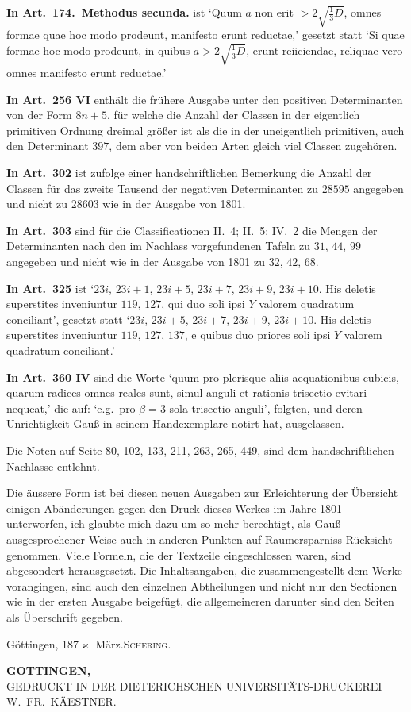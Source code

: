 \documentclass[12pt,a4paper]{article}
\theoremstyle{plain}
\theoremstyle{definition}
\theoremstyle{remark}
\begin{document}
\textbf{In Art.\ 174.\ Methodus secunda.} ist `Quum $a$ non erit $> 2\sqrt{\tfrac{1}{3}D}$, omnes formae quae hoc modo prodeunt, manifesto erunt reductae,' gesetzt statt `Si quae formae hoc modo prodeunt, in quibus $a > 2\sqrt{\tfrac{1}{3}D}$, erunt reiiciendae, reliquae vero omnes manifesto erunt reductae.'

\textbf{In Art.\ 256 VI} enth\"alt die fr\"uhere Ausgabe unter den positiven Determinanten von der Form $8n+5$, f\"ur welche die Anzahl der Classen in der eigentlich primitiven Ordnung dreimal gr\"o\ss er ist als die in der uneigentlich primitiven, auch den Determinant $397$, dem aber von beiden Arten gleich viel Classen zugeh\"oren.

\textbf{In Art.\ 302} ist zufolge einer handschriftlichen Bemerkung die Anzahl der Classen f\"ur das zweite Tausend der negativen Determinanten zu $28595$ angegeben und nicht zu $28603$ wie in der Ausgabe von 1801.

\textbf{In Art.\ 303} sind f\"ur die Classificationen II.\ 4; II.\ 5; IV.\ 2 die Mengen der Determinanten nach den im Nachlass vorgefundenen Tafeln zu $31$, $44$, $99$ angegeben und nicht wie in der Ausgabe von 1801 zu $32$, $42$, $68$.

\textbf{In Art.\ 325} ist `$23i$, $23i+1$, $23i+5$, $23i+7$, $23i+9$, $23i+10$. His deletis superstites inveniuntur $119$, $127$, qui duo soli ipsi $Y$ valorem quadratum conciliant', gesetzt statt `$23i$, $23i+5$, $23i+7$, $23i+9$, $23i+10$. His deletis superstites inveniuntur $119$, $127$, $137$, e quibus duo priores soli ipsi $Y$ valorem quadratum conciliant.'

\textbf{In Art.\ 360 IV} sind die Worte `quum pro plerisque aliis aequationibus cubicis, quarum radices omnes reales sunt, simul anguli et rationis trisectio evitari nequeat,' die auf: `e.g.\ pro $\beta = 3$ sola trisectio anguli', folgten, und deren Unrichtigkeit Gau\ss{} in seinem Handexemplare notirt hat, ausgelassen.

Die Noten auf Seite 80, 102, 133, 211, 263, 265, 449, sind dem handschriftlichen Nachlasse entlehnt.

Die \"aussere Form ist bei diesen neuen Ausgaben zur Erleichterung der \"Ubersicht einigen Ab\"anderungen gegen den Druck dieses Werkes im Jahre 1801 unterworfen, ich glaubte mich dazu um so mehr berechtigt, als Gau\ss{} ausgesprochener Weise auch in anderen Punkten auf Raumersparniss R\"ucksicht genommen. Viele Formeln, die der Textzeile eingeschlossen waren, sind abgesondert herausgesetzt. Die Inhaltsangaben, die zusammengestellt dem Werke vorangingen, sind auch den einzelnen Abtheilungen und nicht nur den Sectionen wie in der ersten Ausgabe beigef\"ugt, die allgemeineren darunter sind den Seiten als \"Uberschrift gegeben.

\vspace{1em}
\begin{flushright}
G\"ottingen, 187$\varkappa$ M\"arz.\quad\textsc{Schering}.
\end{flushright}

\vspace{2em}
\begin{center}
\textbf{GOTTINGEN,}\\
GEDRUCKT IN DER DIETERICHSCHEN UNIVERSIT\"ATS-DRUCKEREI\\
W.\ FR.\ K\"AESTNER.
\end{center}
\end{document}
